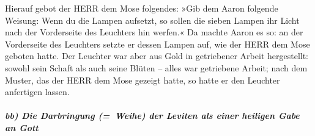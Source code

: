 Hierauf gebot der HERR dem Mose folgendes:
»Gib dem Aaron folgende Weisung: Wenn du die Lampen
aufsetzt, so sollen die sieben Lampen ihr Licht nach der Vorderseite des
Leuchters hin werfen.« Da machte Aaron es so: an der
Vorderseite des Leuchters setzte er dessen Lampen auf, wie der HERR dem
Mose geboten hatte. Der Leuchter war aber aus Gold in
getriebener Arbeit hergestellt: sowohl sein Schaft als auch seine Blüten
-- alles war getriebene Arbeit; nach dem Muster, das der HERR dem Mose
gezeigt hatte, so hatte er den Leuchter anfertigen lassen.

\hypertarget{bb-die-darbringung-weihe-der-leviten-als-einer-heiligen-gabe-an-gott}{%
\subparagraph{bb) Die Darbringung (=~Weihe) der Leviten als einer
heiligen Gabe an
Gott}\label{bb-die-darbringung-weihe-der-leviten-als-einer-heiligen-gabe-an-gott}}

